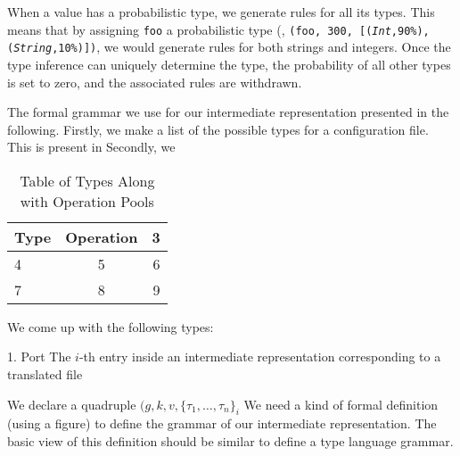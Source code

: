 When a value has a probabilistic type, we generate rules for all its types.
This means that by assigning {\texttt{foo}} a probabilistic type 
(\eg, {\tt (\texttt{foo}, 300, [(\textsl{Int},90\%), 
(\textsl{String},10\%)])},
we would generate rules for both strings and integers.
Once the type inference can uniquely determine the type, 
the probability of all other types is set to zero, 
and the associated rules are withdrawn.

The formal grammar we use for our intermediate representation presented in the following. 
Firstly, we make a list of the possible types for a configuration file. This is present in 
Secondly, we 

\begin{table}
  \begin{tabular}{| l | c | r |}
    \hline
    Type & Operation & 3 \\ \hline
    4 & 5 & 6 \\ \hline
    7 & 8 & 9 \\
    \hline
  \end{tabular}
\caption{Table of Types Along with Operation Pools}
\label{table:kysymys}
\end{table}

We come up with the following types:

1. Port 
The $i$-th entry inside an intermediate representation corresponding to a 
translated file 

We declare a quadruple $(g,k,v,\{\tau_1, \ldots, \tau_n\}_i$
We need a kind of formal definition (using a figure) to
define the grammar of our intermediate representation. The basic
view of this definition should be similar to define a type language
grammar.


